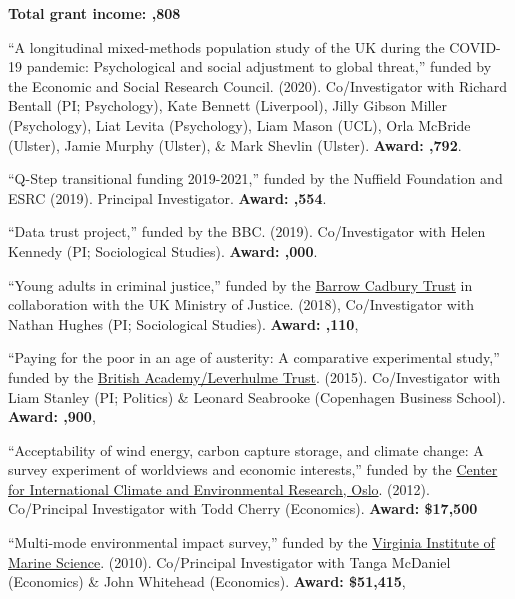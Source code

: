 \documentclass[12pt]{article}
\begin{document}
\begin{bibsection}
	\item \textbf{Total grant income: ,808}

\item ``A longitudinal mixed-methods population study of the UK during the COVID-19 pandemic: Psychological and social adjustment to global threat,'' funded by the Economic and Social Research Council. (2020). Co\-/Investigator with Richard Bentall (PI; Psychology), Kate Bennett (Liverpool), Jilly Gibson Miller (Psychology), Liat Levita (Psychology), Liam Mason (UCL), Orla McBride (Ulster), Jamie Murphy (Ulster), \& Mark Shevlin (Ulster). \textbf{Award: ,792}. 

	\item ``Q-Step transitional funding 2019-2021,'' funded by the Nuffield Foundation and ESRC (2019).
	Principal Investigator. \textbf{Award: ,554}.

	\item ``Data trust project,'' funded by the BBC. (2019). Co\-/Investigator with 
	Helen Kennedy (PI; Sociological Studies). \textbf{Award: ,000}. 

	\item ``Young adults in criminal justice,'' funded by the 
	\href{https://www.barrowcadbury.org.uk/}{Barrow Cadbury Trust} in collaboration with 
	the UK Ministry of Justice. 
 	(2018), Co\-/Investigator with Nathan Hughes (PI; Sociological Studies). \textbf{Award: ,110}, 

  \item ``Paying for the poor in an age of austerity: 
    A comparative experimental study,'' funded by the \href{http://www.britac.ac.uk/index.cfm}
    {British Academy/Leverhulme Trust}.
   (2015). Co\-/Investigator with Liam Stanley (PI; Politics) \& Leonard 
    Seabrooke (Copenhagen Business School).  \textbf{Award: ,900},
    
     \item ``Acceptability of wind energy, carbon capture storage, 
    and climate change: A survey experiment of worldviews and 
    economic interests,'' funded by 
    the \href{http://www.cicero.uio.no/}
    {Center for International Climate and Environmental Research, Oslo}. 
    (2012). Co\-/Principal Investigator with Todd Cherry (Economics). \textbf{Award: \$17,500}
    
     \item ``Multi-mode environmental impact survey,''
    funded by the \href{http://www.vims.edu/}
    {Virginia Institute of Marine Science}. (2010). Co\-/Principal Investigator with Tanga McDaniel (Economics) \& John Whitehead (Economics). \textbf{Award: \$51,415},


\end{bibsection}
\end{document}
